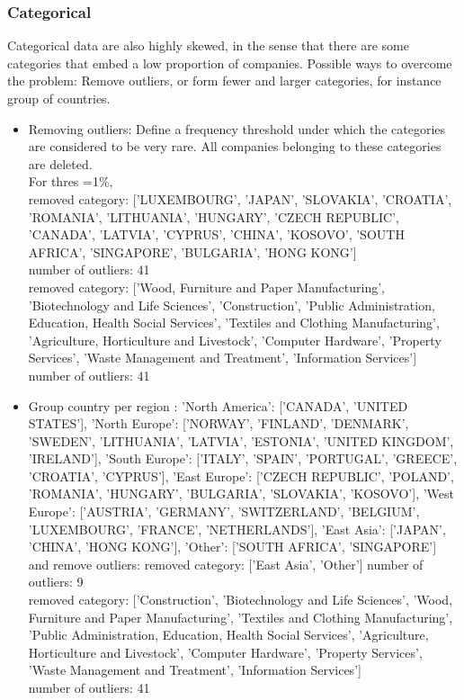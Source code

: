 \documentclass[ 11pt]{article}
\begin{document}
	\subsubsection{Categorical}
	Categorical data are also highly skewed, in the sense that there are some categories that embed a low proportion of companies. Possible ways to overcome the problem: Remove outliers, or form fewer and larger categories, for instance group of countries. 
	
	\begin{itemize}
		\item Removing outliers: Define a frequency threshold under which the categories are considered to be very rare. All companies belonging to these categories are deleted. \\
		For thres =1\%,  \\removed category:  ['LUXEMBOURG', 'JAPAN', 'SLOVAKIA', 'CROATIA', 'ROMANIA', 'LITHUANIA', 'HUNGARY', 'CZECH REPUBLIC', 'CANADA', 'LATVIA', 'CYPRUS', 'CHINA', 'KOSOVO', 'SOUTH AFRICA', 'SINGAPORE', 'BULGARIA', 'HONG KONG']\\
number of outliers:  41\\
removed category:  ['Wood, Furniture and Paper Manufacturing', 'Biotechnology and Life Sciences', 'Construction', 'Public Administration, Education, Health Social Services', 'Textiles and Clothing Manufacturing', 'Agriculture, Horticulture and Livestock', 'Computer Hardware', 'Property Services', 'Waste Management and Treatment', 'Information Services']\\
number of outliers:  41
		\item Group country per region :     'North America': ['CANADA', 'UNITED STATES'],
    'North Europe': ['NORWAY', 'FINLAND', 'DENMARK', 'SWEDEN',  'LITHUANIA', 'LATVIA', 'ESTONIA', 'UNITED KINGDOM', 'IRELAND'],
    'South Europe': ['ITALY', 'SPAIN', 'PORTUGAL', 'GREECE', 'CROATIA', 'CYPRUS'],
    'East Europe': ['CZECH REPUBLIC', 'POLAND',   'ROMANIA', 'HUNGARY', 'BULGARIA', 'SLOVAKIA', 'KOSOVO'],
    'West Europe': ['AUSTRIA', 'GERMANY', 'SWITZERLAND', 'BELGIUM', 'LUXEMBOURG', 'FRANCE', 'NETHERLANDS'],
    'East Asia': ['JAPAN', 'CHINA', 'HONG KONG'],
    'Other': ['SOUTH AFRICA', 'SINGAPORE']
    \\ and remove outliers:
    removed category:  ['East Asia', 'Other']
number of outliers:  9\\
removed category:  ['Construction', 'Biotechnology and Life Sciences', 'Wood, Furniture and Paper Manufacturing', 'Textiles and Clothing Manufacturing', 'Public Administration, Education, Health Social Services', 'Agriculture, Horticulture and Livestock', 'Computer Hardware', 'Property Services', 'Waste Management and Treatment', 'Information Services']\\
number of outliers:  41
		
	\end{itemize}
	
\end{document}
